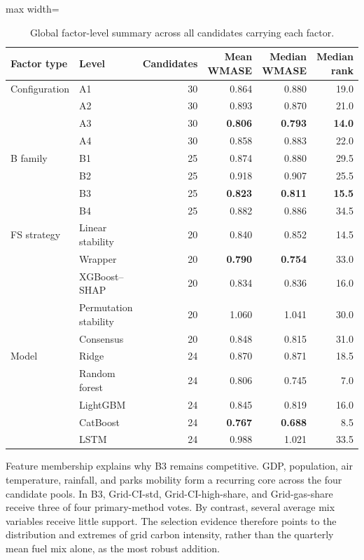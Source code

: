 \documentclass[preprint,12pt]{elsarticle}
\begin{document}
\begin{table}[!htbp]
\centering
\caption{Global factor-level summary across all candidates carrying each factor.}
\label{tab:factor_summary}
\footnotesize
\begin{adjustbox}{max width=\textwidth}
\begin{tabular}{@{}llrrrr@{}}
\toprule
Factor type & Level & Candidates & Mean WMASE & Median WMASE & Median rank \\
\midrule
Configuration & A1 & 30 & 0.864 & 0.880 & 19.0 \\
 & A2 & 30 & 0.893 & 0.870 & 21.0 \\
 & A3 & 30 & \textbf{0.806} & \textbf{0.793} & \textbf{14.0} \\
 & A4 & 30 & 0.858 & 0.883 & 22.0 \\
B family & B1 & 25 & 0.874 & 0.880 & 29.5 \\
 & B2 & 25 & 0.918 & 0.907 & 25.5 \\
 & B3 & 25 & \textbf{0.823} & \textbf{0.811} & \textbf{15.5} \\
 & B4 & 25 & 0.882 & 0.886 & 34.5 \\
FS strategy & Linear stability & 20 & 0.840 & 0.852 & 14.5 \\
 & Wrapper & 20 & \textbf{0.790} & \textbf{0.754} & 33.0 \\
 & XGBoost--SHAP & 20 & 0.834 & 0.836 & 16.0 \\
 & Permutation stability & 20 & 1.060 & 1.041 & 30.0 \\
 & Consensus & 20 & 0.848 & 0.815 & 31.0 \\
Model & Ridge & 24 & 0.870 & 0.871 & 18.5 \\
 & Random forest & 24 & 0.806 & 0.745 & 7.0 \\
 & LightGBM & 24 & 0.845 & 0.819 & 16.0 \\
 & CatBoost & 24 & \textbf{0.767} & \textbf{0.688} & 8.5 \\
 & LSTM & 24 & 0.988 & 1.021 & 33.5 \\
\bottomrule
\end{tabular}
\end{adjustbox}
\end{table}

Feature membership explains why B3 remains competitive. GDP, population, air temperature, rainfall, and parks mobility form a recurring core across the four candidate pools. In B3, Grid-CI-std, Grid-CI-high-share, and Grid-gas-share receive three of four primary-method votes. By contrast, several average mix variables receive little support. The selection evidence therefore points to the distribution and extremes of grid carbon intensity, rather than the quarterly mean fuel mix alone, as the most robust addition.
\end{document}
